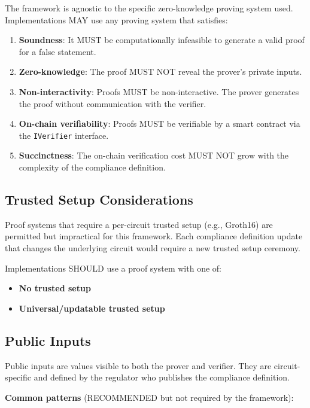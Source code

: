 \documentclass[9pt]{extreport}
\begin{document}
The framework is agnostic to the specific zero-knowledge proving system used. Implementations MAY use any proving system that satisfies:

\begin{enumerate}
    \item \textbf{Soundness}: It MUST be computationally infeasible to generate a valid proof for a false statement.
    \item \textbf{Zero-knowledge}: The proof MUST NOT reveal the prover's private inputs.
    \item \textbf{Non-interactivity}: Proofs MUST be non-interactive. The prover generates the proof without communication with the verifier.
    \item \textbf{On-chain verifiability}: Proofs MUST be verifiable by a smart contract via the \texttt{IVerifier} interface.
    \item \textbf{Succinctness}: The on-chain verification cost MUST NOT grow with the complexity of the compliance definition.
\end{enumerate}

\subsection{Trusted Setup Considerations}
\label{sec:trusted-setup}

Proof systems that require a per-circuit trusted setup (e.g., Groth16) are permitted but impractical for this framework. Each compliance definition update that changes the underlying circuit would require a new trusted setup ceremony.

Implementations SHOULD use a proof system with one of:
\begin{itemize}
    \item \textbf{No trusted setup}
    \item \textbf{Universal/updatable trusted setup}
\end{itemize}

\subsection{Public Inputs}
\label{sec:public-inputs}

Public inputs are values visible to both the prover and verifier. They are circuit-specific and defined by the regulator who publishes the compliance definition.

\textbf{Common patterns} (RECOMMENDED but not required by the framework):
\end{document}
